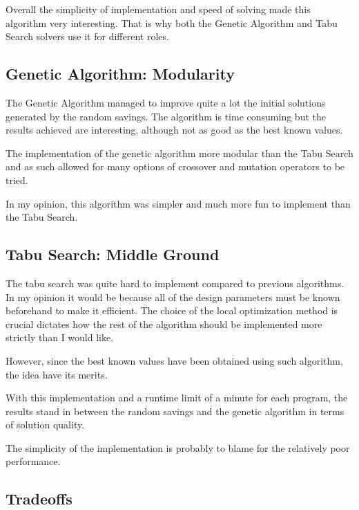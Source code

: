 \documentclass{article} %
\begin{document}
Overall the simplicity of implementation and speed of solving made this algorithm very interesting. That is why both the Genetic Algorithm and Tabu Search solvers use it for different roles.



\subsection{Genetic Algorithm: Modularity}

The Genetic Algorithm managed to improve quite a lot the initial solutions generated by the random savings.
The algorithm is time consuming but the results achieved are interesting, although not as good as the best known values.\newline

The implementation of the genetic algorithm more modular than the Tabu Search and as such allowed for many options of crossover and mutation operators to be tried.\newline


In my opinion, this algorithm was simpler and much more fun to implement than the Tabu Search.


\subsection{Tabu Search: Middle Ground}

The tabu search was quite hard to implement compared to previous algorithms. In my opinion it would be because all of the design parameters must be known beforehand to make it efficient. The choice of the local optimization method is crucial dictates how the rest of the algorithm should be implemented more strictly than I would like.\newline

However, since the best known values have been obtained using such algorithm, the idea have its merits.\newline

With this implementation and a runtime limit of a minute for each program, the results stand in between the random savings and the genetic algorithm in terms of solution quality.\newline

The simplicity of the implementation is probably to blame for the relatively poor performance.


\subsection{Tradeoffs}
\end{document}
